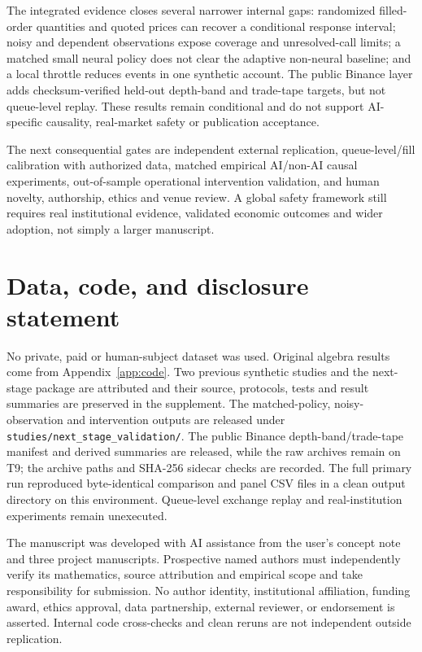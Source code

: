 \documentclass[11pt,a4paper]{article}
\theoremstyle{definition}
\theoremstyle{remark}
\begin{document}
The integrated evidence closes several narrower internal gaps: randomized filled-order quantities and quoted prices can recover a conditional response interval; noisy and dependent observations expose coverage and unresolved-call limits; a matched small neural policy does not clear the adaptive non-neural baseline; and a local throttle reduces events in one synthetic account. The public Binance layer adds checksum-verified held-out depth-band and trade-tape targets, but not queue-level replay. These results remain conditional and do not support AI-specific causality, real-market safety or publication acceptance.

The next consequential gates are independent external replication, queue-level/fill calibration with authorized data, matched empirical AI/non-AI causal experiments, out-of-sample operational intervention validation, and human novelty, authorship, ethics and venue review. A global safety framework still requires real institutional evidence, validated economic outcomes and wider adoption, not simply a larger manuscript.

\section*{Data, code, and disclosure statement}
No private, paid or human-subject dataset was used. Original algebra results come from Appendix~\ref{app:code}. Two previous synthetic studies and the next-stage package are attributed and their source, protocols, tests and result summaries are preserved in the supplement. The matched-policy, noisy-observation and intervention outputs are released under \texttt{studies/next\_stage\_validation/}. The public Binance depth-band/trade-tape manifest and derived summaries are released, while the raw archives remain on T9; the archive paths and SHA-256 sidecar checks are recorded. The full primary run reproduced byte-identical comparison and panel CSV files in a clean output directory on this environment. Queue-level exchange replay and real-institution experiments remain unexecuted.

The manuscript was developed with AI assistance from the user's concept note and three project manuscripts. Prospective named authors must independently verify its mathematics, source attribution and empirical scope and take responsibility for submission. No author identity, institutional affiliation, funding award, ethics approval, data partnership, external reviewer, or endorsement is asserted. Internal code cross-checks and clean reruns are not independent outside replication.
\end{document}

